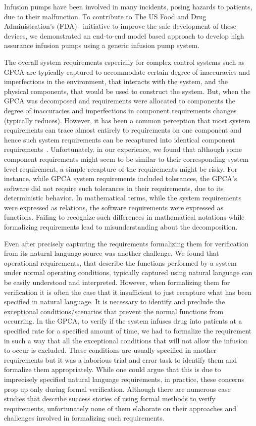 Infusion pumps have been involved in many incidents, posing hazards to patients, due to their malfunction. To contribute to The US Food and Drug Administration's (FDA)~\cite{fda2010whitepaper} initiative to improve the safe development of these devices, we demonstrated an end-to-end model based approach to develop high assurance infusion pumps using a generic infusion pump system.

The overall system requirements especially for complex control systems such as GPCA are typically captured to accommodate certain degree of inaccuracies and imperfections in the environment, that interacts with the system, and the physical components, that would be used to construct the system. But, when the GPCA was decomposed and requirements were allocated to components the degree of inaccuracies and imperfections in component requirements changes (typically reduces). However, it has been a common perception that most system requirements can trace almost entirely to requirements on one component and hence such system requirements can be recaptured into identical component requirements~\cite{Miller01:dasc}. Unfortunately, in our experience, we found that although some component requirements might seem to be similar to their corresponding system level requirement, a simple recapture of the requirements might be risky. For instance, while GPCA system requirements included tolerances, the GPCA's software did not require such tolerances in their requirements, due to its deterministic behavior. In mathematical terms, while the system requirements were expressed as relations, the software requirements were expressed as functions. Failing to recognize such differences in mathematical notations while formalizing requirements lead to misunderstanding about the decomposition.

Even after precisely capturing the requirements formalizing them for verification from its natural language source was another challenge. We found that operational requirements, that describe the functions performed by a system under normal operating conditions, typically captured using natural language can be easily understood and interpreted. However, when formalizing them for verification it is often the case that it insufficient to just recapture what has been specified in natural language. It is necessary to identify and preclude the exceptional conditions/scenarios that prevent the normal functions from occurring. In the GPCA, to verify if the system infuses drug into patients at a specified rate for a specified amount of time, we had to formalize the requirement in such a way that all the exceptional conditions that will not allow the infusion to occur is excluded. These conditions are usually specified in another requirements but it was a laborious trial and error task to identify them and formalize them appropriately. While one could argue that this is due to imprecisely specified natural language requirements, in practice, these concerns prop up only during formal verification. Although there are numerous case studies that describe success stories of using formal methods to verify requirements, unfortunately none of them elaborate on their approaches and challenges involved in formalizing such requirements.

